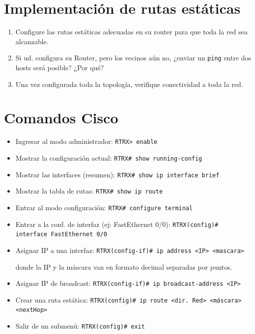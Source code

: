 \documentclass[a4paper,10pt]{article}
\begin{document}
\section{Implementación de rutas estáticas}

\begin{enumerate}
    \item Configure las rutas estáticas adecuadas en su router para que toda la red sea alcanzable.
    \item Si ud. configura su Router, pero los vecinos aún no, ¿enviar un \texttt{ping} entre dos hosts será posible? ¿Por qué?
    \item Una vez configurada toda la topología, verifique conectividad a toda la red.
\end{enumerate}


\appendix

\section{Comandos Cisco}

\begin{itemize}
    \item Ingresar al modo administrador:
\texttt{RTRX> enable}
    \item Mostrar la configuración actual:
    \texttt{RTRX# show running-config}
    \item Mostrar las interfaces (resumen): \texttt{RTRX# show ip interface brief}
    \item Mostrar la tabla de rutas:
    \texttt{RTRX# show ip route}
    \item Entrar al modo configuración: \texttt{RTRX# configure terminal}
    \item Entrar a la conf. de interfaz (ej: FastEthernet 0/0): \texttt{RTRX(config)# interface FastEthernet 0/0}
    \item Asignar IP a una interfaz: \texttt{RTRX(config-if)# ip address <IP> <mascara>}
    
    donde la IP y la máscara van en formato decimal separadas por puntos.
    \item Asignar IP de broadcast: \texttt{RTRX(config-if)# ip broadcast-address <IP>}
    \item Crear una ruta estática: \texttt{RTRX(config)# ip route <dir. Red> <máscara> <nextHop>}
    \item Salir de un submenú: \texttt{RTRX(config)# exit}

\end{itemize}
\end{document}

